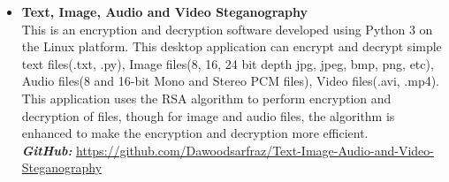\documentclass[a4paper,12pt]{article}
\begin{document}
\begin{itemize}
\item \textbf{Text, Image, Audio and Video Steganography} \\
This is an encryption and decryption software developed using Python 3 on the Linux platform. This desktop application can encrypt and decrypt simple text files(.txt, .py), Image files(8, 16, 24 bit depth jpg, jpeg, bmp, png, etc), Audio files(8 and 16-bit Mono and Stereo PCM files), Video files(.avi, .mp4). 
This application uses the RSA algorithm to perform encryption and decryption of files, though for image and audio files, the algorithm is enhanced to make the encryption and decryption more efficient.  \\
\textbf{\textit{GitHub:}} \href{https://github.com/Dawoodsarfraz/Text-Image-Audio-and-Video-Steganography}{https://github.com/Dawoodsarfraz/Text-Image-Audio-and-Video-Steganography}
	
\end{itemize}
\end{document}

